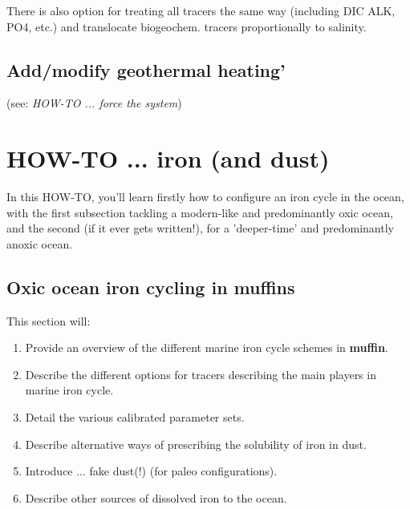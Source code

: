 \documentclass[11pt,fleqn]{book} %
\begin{document}
There is also option for treating all tracers the same way (including DIC ALK, PO4, etc.) and translocate biogeochem. tracers proportionally to salinity.

%
\subsection*{Add/modify geothermal heating'}

(see: \textit{HOW-TO ... force the system})


\newpage


\section{HOW-TO ...  iron (and dust)}

In this HOW-TO, you'll learn firstly how to configure an iron cycle in the ocean, with the first subsection tackling a modern-like and predominantly oxic ocean, and the second (if it ever gets written!), for a 'deeper-time' and predominantly anoxic ocean.

%
\newpage
\subsection*{Oxic ocean iron cycling in muffins}
\vspace{2mm}

This section will:
\vspace{1mm}
\begin{enumerate}[noitemsep]
\item Provide an overview of the different marine iron cycle schemes in \textbf{muffin}.
\item Describe the different options  for tracers describing the main players in marine iron cycle.
\item Detail the various calibrated parameter sets.
\item Describe alternative ways of prescribing the solubility of iron in dust.
\item Introduce ... fake dust(!) (for paleo configurations).
\item Describe other sources of dissolved iron to the ocean.
\end{enumerate}
\end{document}
